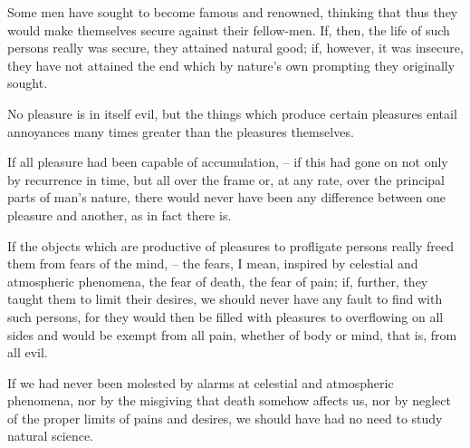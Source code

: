 \documentclass{stex}
\begin{document}
\vspace{0.5em}
\begin{sparagraph}[title=7]
  Some men have sought to become famous and renowned, thinking that thus they would make themselves secure against their fellow-men.
  If, then, the life of such persons really was secure, they attained natural good; if, however, it was insecure, they have not attained the end which by nature's own prompting they originally sought.
\end{sparagraph}

\vspace{0.5em}
\begin{sparagraph}[title=8]
  No pleasure is in itself evil, but the things which produce certain pleasures entail annoyances many times greater than the pleasures themselves.
\end{sparagraph}

\vspace{0.5em}
\begin{sparagraph}[title=9]
  If all pleasure had been capable of accumulation, – if this had gone on not only by recurrence in time, but all over the frame or, at any rate, over the principal parts of man's nature, there would never have been any difference between one pleasure and another, as in fact there is.
\end{sparagraph}

\vspace{0.5em}
\begin{sparagraph}[title=10]
  If the objects which are productive of pleasures to profligate persons really freed them from fears of the mind, – the fears, I mean, inspired by celestial and atmospheric phenomena, the fear of death, the fear of pain; if, further, they taught them to limit their desires, we should never have any fault to find with such persons, for they would then be filled with pleasures to overflowing on all sides and would be exempt from all pain, whether of body or mind, that is, from all evil.
\end{sparagraph}

\vspace{0.5em}
\begin{sparagraph}[title=11]
  If we had never been molested by alarms at celestial and atmospheric phenomena, nor by the misgiving that death somehow affects us, nor by neglect of the proper limits of pains and desires, we should have had no need to study natural science.
\end{sparagraph}
\end{document}
